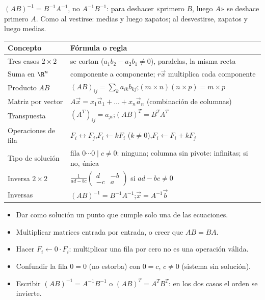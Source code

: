 \documentclass[11pt,a4paper]{article}
\let\zukarepaso\repaso
\renewcommand{\repaso}{\needspace{6\baselineskip}\zukarepaso}
\begin{document}
\begin{ojo}
$(AB)^{-1}=B^{-1}A^{-1}$, no $A^{-1}B^{-1}$: para deshacer «primero $B$, luego $A$» se deshace primero $A$.
Como al vestirse: medias y luego zapatos; al desvestirse, zapatos y luego medias.
\end{ojo}

\repaso
\begin{center}
\begin{tabularx}{\linewidth}{@{}l L@{}}
\toprule
Concepto & Fórmula o regla\\ \midrule
Tres casos $2\times2$ & se cortan ($a_1b_2-a_2b_1\neq0$), paralelas, la misma recta\\
Suma en $\R^n$ & componente a componente; $r\vec x$ multiplica cada componente\\
Producto $AB$ & $(AB)_{ij}=\sum_k a_{ik}b_{kj}$;\quad $(m\times n)(n\times p)=m\times p$\\
Matriz por vector & $A\vec x=x_1\vec a_1+\dots+x_n\vec a_n$ (combinación de columnas)\\
Transpuesta & $(A^T)_{ij}=a_{ji}$;\quad $(AB)^T=B^TA^T$\\
Operaciones de fila & $F_i\leftrightarrow F_j$,\quad $F_i\leftarrow kF_i$ ($k\neq0$),\quad $F_i\leftarrow F_i+kF_j$\\
Tipo de solución & fila $0\cdots0\mid c\neq0$: ninguna; columna sin pivote: infinitas; si no, única\\
Inversa $2\times2$ & $\frac{1}{ad-bc}\begin{pmatrix} d & -b\\ -c & a\end{pmatrix}$ si $ad-bc\neq0$\\
Inversas & $(AB)^{-1}=B^{-1}A^{-1}$;\quad $\vec x=A^{-1}\vec b$\\
\bottomrule
\end{tabularx}
\end{center}

\begin{ojo}
\begin{itemize}
\item Dar como solución un punto que cumple solo una de las ecuaciones.
\item Multiplicar matrices entrada por entrada, o creer que $AB=BA$.
\item Hacer $F_i\leftarrow 0\cdot F_i$: multiplicar una fila por cero no es una operación válida.
\item Confundir la fila $0=0$ (no estorba) con $0=c$, $c\neq0$ (sistema sin solución).
\item Escribir $(AB)^{-1}=A^{-1}B^{-1}$ o $(AB)^T=A^TB^T$: en los dos casos el orden se invierte.
\end{itemize}
\end{ojo}
\end{document}
